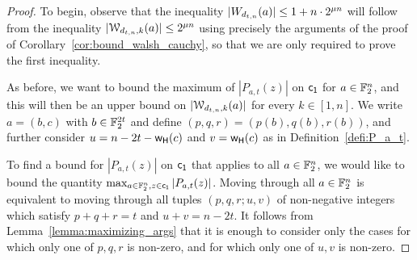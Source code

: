 \documentclass[11pt]{llncs}
\begin{document}
\begin{proof}
    To begin, observe that the inequality $|W_{d_{t,n}}(a)|\leq 1+n\cdot 2^{\mu n}$ will follow from the inequality $|\mathcal{W}_{d_{t,n},k}(a)|\leq 2^{\mu n}$ using precisely the arguments of the proof of Corollary~\ref{cor:bound_walsh_cauchy}, so that we are only required to prove the first inequality.
    
    As before, we want to bound the maximum of $|P_{a,t}(z)|$ on $\mathsf{c_1}$ for $a\in\mathbb{F}_2^n$, and this will then be an upper bound on $|\mathcal{W}_{d_{t,n},k}(a)|$ for every $k\in[1,n]$. 
    We write $a=(b,c)$ with $b\in\mathbb{F}_2^{2t}$ and define $(p,q,r)=(p(b),q(b),r(b))$, and further consider $u=n-2t-\mathsf{w_H}(c)$ and $v=\mathsf{w_H}(c)$ as in Definition~\ref{defi:P_a_t}. 
    
   To find a bound for $|P_{a,t}(z)|$ on $\mathsf{c_1}$ that applies to all $a\in\mathbb{F}_2^n$, we would like to bound the quantity $\max_{a\in\mathbb{F}_2^n,z\in\mathsf{c_1}}|P_{a,t}(z)|$. Moving through all $a\in\mathbb{F}_2^n$ is equivalent to moving through all tuples $(p,q,r;u,v)$ of non-negative integers which satisfy $p+q+r=t$ and $u+v=n-2t$. It follows from Lemma~\ref{lemma:maximizing_args} that it is enough to consider only the cases for which only one of $p,q,r$ is non-zero, and for which only one of $u,v$ is non-zero. 
   



\end{proof}
\end{document}
